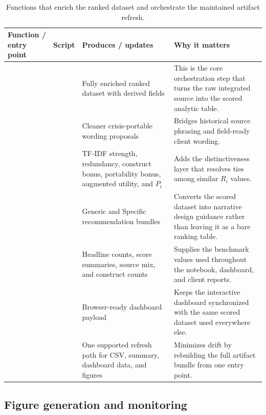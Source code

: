 \documentclass[12pt]{article}
\begin{document}
\begin{table}[H]
\centering
\footnotesize
\begin{tabularx}{\textwidth}{L{0.25\textwidth} L{0.19\textwidth} L{0.21\textwidth} Y}
\toprule
Function / entry point & Script & Produces / updates & Why it matters \\
\midrule
{} &  & Fully enriched ranked dataset with derived fields & This is the core orchestration step that turns the raw integrated source into the scored analytic table. \\
 &  & Cleaner crisis-portable wording proposals & Bridges historical source phrasing and field-ready client wording. \\
 &  & TF-IDF strength, redundancy, construct bonus, portability bonus, augmented utility, and $P_i$ & Adds the distinctiveness layer that resolves ties among similar $R_i$ values. \\
 &  & Generic and Specific recommendation bundles & Converts the scored dataset into narrative design guidance rather than leaving it as a bare ranking table. \\
 &  & Headline counts, score summaries, source mix, and construct counts & Supplies the benchmark values used throughout the notebook, dashboard, and client reports. \\
 &  & Browser-ready dashboard payload & Keeps the interactive dashboard synchronized with the same scored dataset used everywhere else. \\
 &  & One supported refresh path for CSV, summary, dashboard data, and figures & Minimizes drift by rebuilding the full artifact bundle from one entry point. \\
\bottomrule
\end{tabularx}
\caption{Functions that enrich the ranked dataset and orchestrate the maintained artifact refresh.}
\end{table}

\subsection{Figure generation and monitoring}
\end{document}
